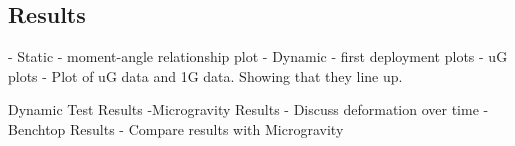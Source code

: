 \subsection{Results}
	- Static
		- moment-angle relationship plot
	- Dynamic
		- first deployment plots
	- uG plots
		- Plot of uG data and 1G data. Showing that they line up. 
		
		
		
		
		Dynamic Test Results
 -Microgravity Results
    - Discuss deformation over time
- Benchtop Results
     - Compare results with Microgravity